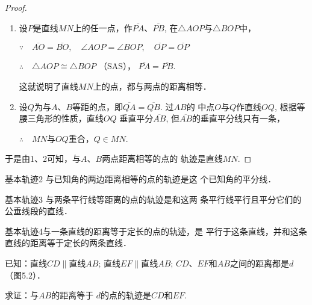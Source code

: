 \begin{proof}
\begin{enumerate}
    \item 
设$P$是直线$MN$上的任一点，作$\overline{PA}$、$\overline{PB}$,
在$\triangle AOP$与$\triangle BOP$中，

$\because\quad \overline{AO}=\overline{BO},\quad \angle AOP=\angle BOP,\quad \overline{OP}=\overline{OP}$

$\therefore\quad \triangle AOP\cong \triangle BOP$ （SAS），
$\overline{PA}=\overline{PB}$.

这就说明了直线$MN$上的点，都与两点的距离相等．

\item 设$Q$为与$A$、$B$等距的点，即$\overline{QA}=\overline{QB}$. 过$AB$的
中点$O$与$Q$作直线$OQ$, 根据等腰三角形的性质，直线$OQ$
垂直平分$\overline{AB}$, 但$\overline{AB}$的垂直平分线只有一条，

$\therefore\quad MN$与$OQ$重合，$Q\in MN$.

\end{enumerate}

于是由1、2可知，与$A$、$B$两点距离相等的点的
轨迹是直线$MN$.
\end{proof}

\begin{blk}
{基本轨迹2} 与已知角的两边距离相等的点的轨迹是这
个已知角的平分线．
\end{blk}

\begin{blk}
{基本轨迹3} 与两条平行线等距离的点的轨迹是和这两
条平行线平行且平分它们的公垂线段的直线．
\end{blk}

\begin{blk}
    {基本轨迹4}与一条直线的距离等于定长的点的轨迹，是
    平行于这条直线，并和这条直线的距离等于定长的两条直线．
\end{blk}

已知：直线$CD\parallel$直线$AB$; 直线$EF\parallel$直线$AB$; $CD$、$EF$和$AB$之间的距离都是$d$（图5.2）．

求证：与$AB$的距离等于
$d$的点的轨迹是$CD$和$EF$.

\begin{figure}[htp]
    \centering
{}
    
    \caption{}
\end{figure}


